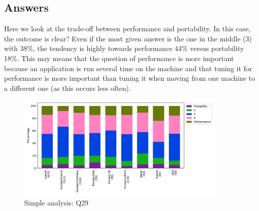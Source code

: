 
\subsection{Answers}


Here we look at the trade-off between performance and portability. In this case,
the outcome is clear? Even if the most given answer is the one in the middle (3)
with 38\%, the tendency is highly towards performance 44\% versus portability
18\%. This may means that the question of performance is more important because an
application is run several time on the machine and that tuning it for performance
is more important than tuning it when moving from one machine to a different one
(as this occurs less often).  

\begin{figure}[htb]
\begin{center}
\includegraphics[width=10cm]{../pdfs/Q29.pdf}
\caption{Simple analysis: Q29}
\label{fig:Q29}
\end{center}
\end{figure}

